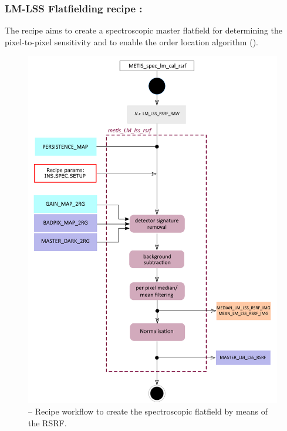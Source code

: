 \subsubsection{LM-LSS Flatfielding recipe :}\label{rec:lsslmrsrf}
The recipe \hyperref[rec:lsslmrsrf]{} aims to create a spectroscopic master flatfield for determining the pixel-to-pixel sensitivity and to enable the order location algorithm (\hyperref[rec:lsslmtrace]{}).
\begin{figure}[ht]
  \centering
  \includegraphics[width=0.5\textheight]{figures/metis_lm_lss_rsrf_v0.74.pdf}
  \caption[Recipe: ]{ --
    Recipe workflow to create the spectroscopic flatfield by means of the \ac{RSRF}.}
  \label{Fig:rec_lm_lss_rsrf}
\end{figure}

